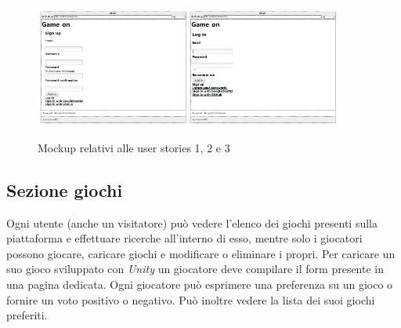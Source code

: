 \begin{figure}[h!]
  \centering
  \includegraphics[width=0.45\textwidth]{mockup_registration}\includegraphics[width=0.45\textwidth]{mockup_login}
  \caption{Mockup relativi alle user stories 1, 2 e 3}
\end{figure}

\subsection{Sezione giochi}

Ogni utente (anche un visitatore) può vedere l'elenco dei giochi presenti sulla piattaforma e effettuare ricerche all'interno di esso, mentre solo i giocatori possono giocare, caricare giochi e modificare o eliminare i propri. Per caricare un suo gioco sviluppato con \textit{Unity} un giocatore deve compilare il form presente in una pagina dedicata. Ogni giocatore può esprimere una preferenza su un gioco o fornire un voto positivo o negativo. Può inoltre vedere la lista dei suoi giochi preferiti.

